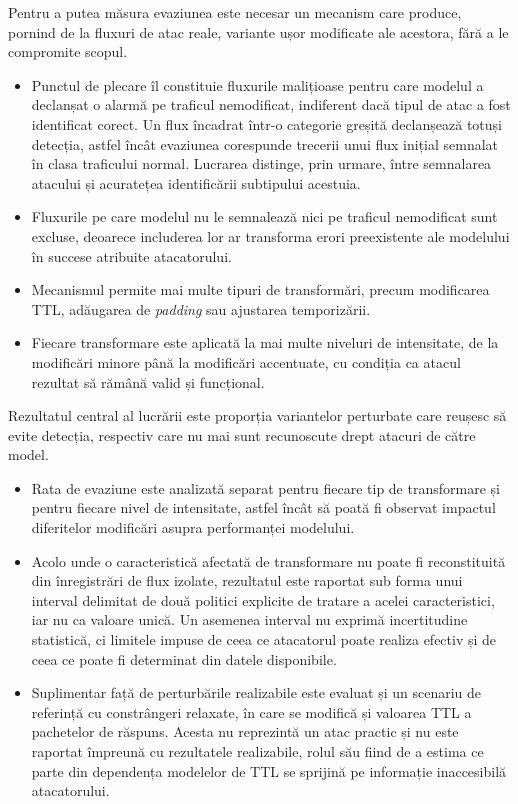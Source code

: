 \begin{description}[style=nextline]
\item[Obiectivul 3. Obținerea unor variante de trafic malițios modificate, dar rămase funcționale.]
Pentru a putea măsura evaziunea este necesar un mecanism care produce, pornind de la fluxuri de
atac reale, variante ușor modificate ale acestora, fără a le compromite scopul.
\begin{itemize}
    \item Punctul de plecare îl constituie fluxurile malițioase pentru care modelul a declanșat
    o alarmă pe traficul nemodificat, indiferent dacă tipul de atac a fost identificat corect.
    Un flux încadrat într-o categorie greșită declanșează totuși detecția, astfel încât evaziunea
    corespunde trecerii unui flux inițial semnalat în clasa traficului normal. Lucrarea distinge,
    prin urmare, între semnalarea atacului și acuratețea identificării subtipului acestuia.
    \item Fluxurile pe care modelul nu le semnalează nici pe traficul nemodificat sunt excluse,
    deoarece includerea lor ar transforma erori preexistente ale modelului în succese atribuite
    atacatorului.
    \item Mecanismul permite mai multe tipuri de transformări, precum modificarea TTL, adăugarea
    de \textit{padding} sau ajustarea temporizării.
    \item Fiecare transformare este aplicată la mai multe niveluri de intensitate, de la
    modificări minore până la modificări accentuate, cu condiția ca atacul rezultat să rămână
    valid și funcțional.
\end{itemize}

\item[Obiectivul 4. Determinarea proporției de atacuri care scapă nedetectate.]
Rezultatul central al lucrării este proporția variantelor perturbate care reușesc să evite
detecția, respectiv care nu mai sunt recunoscute drept atacuri de către model.
\begin{itemize}
    \item Rata de evaziune este analizată separat pentru fiecare tip de transformare și pentru
    fiecare nivel de intensitate, astfel încât să poată fi observat impactul diferitelor
    modificări asupra performanței modelului.
    \item Acolo unde o caracteristică afectată de transformare nu poate fi reconstituită din
    înregistrări de flux izolate, rezultatul este raportat sub forma unui interval delimitat de
    două politici explicite de tratare a acelei caracteristici, iar nu ca valoare unică. Un
    asemenea interval nu exprimă incertitudine statistică, ci limitele impuse de ceea ce
    atacatorul poate realiza efectiv și de ceea ce poate fi determinat din datele disponibile.
    \item Suplimentar față de perturbările realizabile este evaluat și un scenariu de referință
    cu constrângeri relaxate, în care se modifică și valoarea TTL a pachetelor de răspuns. Acesta
    nu reprezintă un atac practic și nu este raportat împreună cu rezultatele realizabile, rolul
    său fiind de a estima ce parte din dependența modelelor de TTL se sprijină pe informație
    inaccesibilă atacatorului.
\end{itemize}


\end{description}
